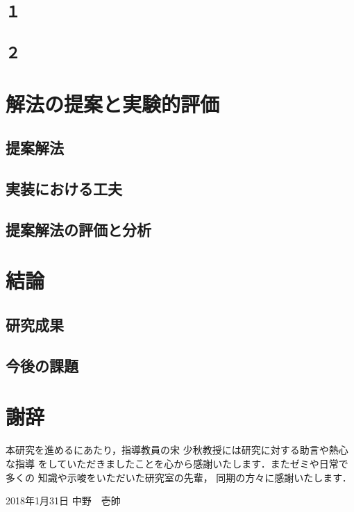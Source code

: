 \documentclass[12pt]{optlab-bachelor}
\def\氏名{中野　壱帥}
\begin{document}
\section{１}

\section{２}

\chapter{解法の提案と実験的評価}

\section{提案解法}

\section{実装における工夫}

\section{提案解法の評価と分析}

\chapter{結論}

\section{研究成果}

\section{今後の課題}

\chapter*{謝辞}
本研究を進めるにあたり，指導教員の宋 少秋教授には研究に対する助言や熱心な指導
をしていただきましたことを心から感謝いたします．またゼミや日常で多くの
知識や示唆をいただいた研究室の先輩，
同期の方々に感謝いたします．

\begin{flushright}
  2018年1月31日 \氏名
\end{flushright}
\endmatter %
\end{document}
